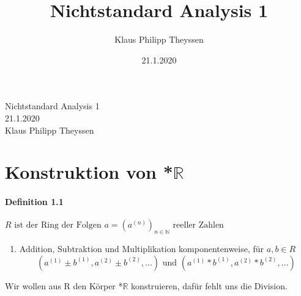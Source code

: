 \documentclass[a4paper]{article}
\title{Nichtstandard Analysis 1}
\date{21.1.2020}
\author{Klaus Philipp Theyssen}
\begin{document}
\begin{center}
      \Large Nichtstandard Analysis 1\\
      \normalsize 21.1.2020\\
      Klaus Philipp Theyssen
\end{center}



\section{Konstruktion von *$\mathbb{R}$}
\paragraph{Definition 1.1} $ R \text{ ist der Ring der Folgen }  a = (a^{(n)})_{n \in \mathbb{N}} \text{ reeller Zahlen} $
\begin{enumerate}
      \item Addition, Subtraktion und Multiplikation komponentenweise, für $a, b \in R$  
            $$ (a^{(1)} \pm b^{(1)}, a^{(2)} \pm b^{(2)},...) \text{ und } (a^{(1)} * b^{(1)}, a^{(2)} * b^{(2)},...) $$ 
\end{enumerate}
\smallskip
Wir wollen aus R den Körper *$\mathbb{R}$ konstruieren, dafür fehlt uns die Division. 

\end{document}

